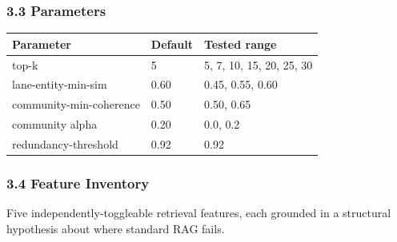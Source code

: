 \documentclass[
]{article}
\begin{document}
\subsubsection{3.3 Parameters}\label{parameters}

\begin{small}
\setlength{\tabcolsep}{4pt}
\begin{longtable}{p{1.8in}p{0.8in}p{3.0in}}
\toprule
\textbf{Parameter} & \textbf{Default} & \textbf{Tested range} \\
\midrule
\endhead
top-k & 5 & 5, 7, 10, 15, 20, 25, 30 \\
lane-entity-min-sim & 0.60 & 0.45, 0.55, 0.60 \\
community-min-coherence & 0.50 & 0.50, 0.65 \\
community alpha & 0.20 & 0.0, 0.2 \\
redundancy-threshold & 0.92 & 0.92 \\
\bottomrule
\end{longtable}
\end{small}

\subsubsection{3.4 Feature Inventory}\label{feature-inventory}

Five independently-toggleable retrieval features, each grounded in a
structural hypothesis about where standard RAG fails.
\end{document}
